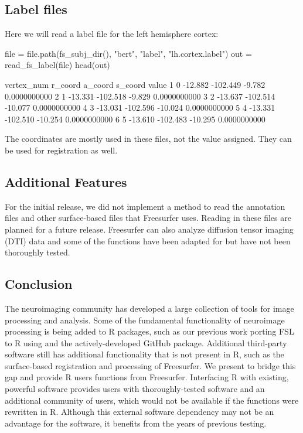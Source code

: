 \subsection{Label files}\label{label-files}

Here we will read a label file for the left hemisphere cortex:

\begin{Schunk}
\begin{Sinput}
file = file.path(fs_subj_dir(), "bert", "label", "lh.cortex.label")
out = read_fs_label(file)
head(out)
\end{Sinput}
\begin{Soutput}
  vertex_num r_coord  a_coord s_coord        value
1          0 -12.882 -102.449  -9.782 0.0000000000
2          1 -13.331 -102.518  -9.829 0.0000000000
3          2 -13.637 -102.514 -10.077 0.0000000000
4          3 -13.031 -102.596 -10.024 0.0000000000
5          4 -13.331 -102.510 -10.254 0.0000000000
6          5 -13.610 -102.483 -10.295 0.0000000000
\end{Soutput}
\end{Schunk}

The coordinates are mostly used in these files, not the value assigned.
They can be used for registration as well.

\subsection{Additional Features}\label{additional-features}

For the initial release, we did not implement a method to read the
annotation files and other surface-based files that Freesurfer uses.
Reading in these files are planned for a future release. Freesurfer can
also analyze diffusion tensor imaging (DTI) data and some of the
functions have been adapted for  but have not been
thoroughly tested.

\subsection{Conclusion}\label{conclusion}

The neuroimaging community has developed a large collection of tools for
image processing and analysis. Some of the fundamental functionality of
neuroimage processing is being added to R packages, such as our previous
work porting FSL to R using  and the actively-developed GitHub
 package. Additional third-party software still has
additional functionality that is not present in R, such as the
surface-based registration and processing of Freesurfer. We present
 to bridge this gap and provide R users functions from
Freesurfer. Interfacing R with existing, powerful software provides
users with thoroughly-tested software and an additional community of
users, which would not be available if the functions were rewritten in
R. Although this external software dependency may not be an advantage
for the software, it benefits from the years of previous testing.

